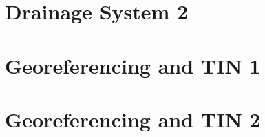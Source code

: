 \documentclass{scrartcl}
\begin{document}
\section{Drainage System 2}
\label{sec:drainage_2}
\clearpage


\section{Georeferencing and TIN 1}
\label{sec:georef_tin_1}
\clearpage

\section{Georeferencing and TIN 2}
\label{sec:georef_tin_2}
\clearpage
\end{document}

